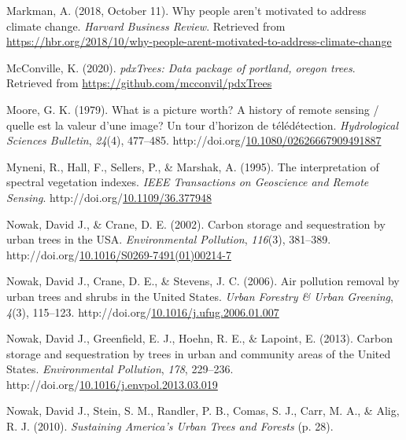 \documentclass[12pt,twoside]{reedthesis}
\newlength{\cslhangindent}
\newenvironment{CSLReferences}[2] %
 {%
  \setlength{\parindent}{0pt}
  \ifodd #1 \everypar{\setlength{\hangindent}{\cslhangindent}}\ignorespaces\fi
  \ifnum #2 > 0
  \setlength{\parskip}{#2\baselineskip}
  \fi
 }%
 {}
\begin{document}
\begin{CSLReferences}{1}{0}
\leavevmode{}%
Markman, A. (2018, October 11). Why people aren{'}t motivated to address climate change. \emph{Harvard Business Review}. Retrieved from \url{https://hbr.org/2018/10/why-people-arent-motivated-to-address-climate-change}

\leavevmode{}%
McConville, K. (2020). \emph{pdxTrees: Data package of portland, oregon trees}. Retrieved from \url{https://github.com/mcconvil/pdxTrees}

\leavevmode{}%
Moore, G. K. (1979). What is a picture worth? A history of remote sensing / quelle est la valeur d'une image? Un tour d'horizon de télédétection. \emph{Hydrological Sciences Bulletin}, \emph{24}(4), 477--485. http://doi.org/\href{https://doi.org/10.1080/02626667909491887}{10.1080/02626667909491887}

\leavevmode{}%
Myneni, R., Hall, F., Sellers, P., \& Marshak, A. (1995). The interpretation of spectral vegetation indexes. \emph{IEEE Transactions on Geoscience and Remote Sensing}. http://doi.org/\href{https://doi.org/10.1109/36.377948}{10.1109/36.377948}

\leavevmode{}%
Nowak, David J., \& Crane, D. E. (2002). Carbon storage and sequestration by urban trees in the USA. \emph{Environmental Pollution}, \emph{116}(3), 381--389. http://doi.org/\href{https://doi.org/10.1016/S0269-7491(01)00214-7}{10.1016/S0269-7491(01)00214-7}

\leavevmode{}%
Nowak, David J., Crane, D. E., \& Stevens, J. C. (2006). Air pollution removal by urban trees and shrubs in the United States. \emph{Urban Forestry \& Urban Greening}, \emph{4}(3), 115--123. http://doi.org/\href{https://doi.org/10.1016/j.ufug.2006.01.007}{10.1016/j.ufug.2006.01.007}

\leavevmode{}%
Nowak, David J., Greenfield, E. J., Hoehn, R. E., \& Lapoint, E. (2013). Carbon storage and sequestration by trees in urban and community areas of the United States. \emph{Environmental Pollution}, \emph{178}, 229--236. http://doi.org/\href{https://doi.org/10.1016/j.envpol.2013.03.019}{10.1016/j.envpol.2013.03.019}

\leavevmode{}%
Nowak, David J., Stein, S. M., Randler, P. B., Comas, S. J., Carr, M. A., \& Alig, R. J. (2010). \emph{Sustaining America{'}s Urban Trees and Forests} (p. 28).


\end{CSLReferences}
\end{document}
